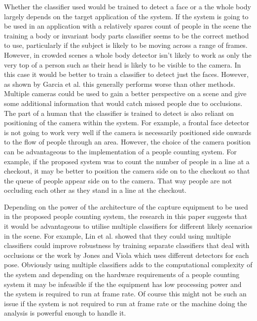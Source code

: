 \documentclass[conference]{IEEEtran}
\begin{document}
Whether the classifier used would be trained to detect a face or a the whole body largely depends on the target application of the system. If the system is going to be used in an application with a relatively spares count of people in the scene the training a body or invariant body parts classifier seems to be the correct method to use, particularly if the subject is likely to be moving across a range of frames. However, in crowded scenes a whole body detector isn't likely to work as only the very top of a person such as their head is likely to be visible to the camera. In this case it would be better to train a classifier to detect just the faces. However, as shown by Garcia et al. \cite{garcia2008effective} this generally performs worse than other methods. Multiple cameras could be used to gain a better perspective on a scene and give some additional information that would catch missed people due to occlusions. The part of a human that the classifier is trained to detect is also reliant on positioning of the camera within the system. For example, a frontal face detector is not going to work very well if the camera is necessarily positioned side onwards to the flow of people through an area. However, the choice of the camera position can be advantageous to the implementation of a people counting system. For example, if the proposed system was to count the number of people in a line at a checkout, it may be better to position the camera side on to the checkout so that the queue of people appear side on to the camera. That way people are not occluding each other as they stand in a line at the checkout.

Depending on the power of the architecture of the capture equipment to be used in the proposed people counting system, the research in this paper suggests that it would be advantageous to utilise multiple classifiers for different likely scenarios in the scene. For example, Lin et al. \cite{lin2004fast} showed that they could using multiple classifiers could improve robustness by training separate classifiers that deal with occlusions or the work by Jones and Viola \cite{jones2003fast} which uses different detectors for each pose. Obviously using multiple classifiers adds to the computational complexity of the system and depending on the hardware requirements of a people counting system it may be infeasible if the the equipment has low processing power and the system is required to run at frame rate. Of course this might not be such an issue if the system is not required to run at frame rate or the machine doing the analysis is powerful enough to handle it.
\end{document}
